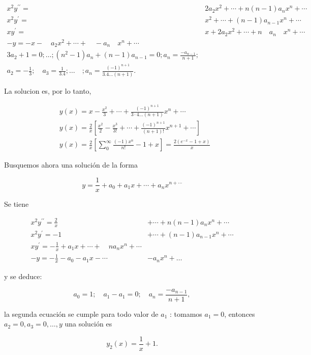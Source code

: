 \documentclass[10pt]{article}
\theoremstyle{plain}
\theoremstyle{definition}
\theoremstyle{remark}
\begin{document}
$$
\begin{array}{cc}
x^{2} y^{\prime \prime}= & 2 a_{2} x^{2}+\cdots+n(n-1) a_{n} x^{n}+\cdots \\
x^{2} y^{\prime}= & x^{2}+\cdots+(n-1) a_{n-1} x^{n}+\cdots \\
x y^{\prime}= & x+2 a_{2} x^{2}+\cdots+n \quad a_{n} \quad x^{n}+\cdots \\
-y=-x-\quad a_{2} x^{2}+\cdots+\quad-a_{n} \quad x^{n}+\cdots \\
3 a_{2}+1=0 ; \ldots ;\left(n^{2}-1\right) a_{n}+(n-1) a_{n-1}=0 ; a_{n}=\frac{-a_{n-1}}{n+1} ; \\
a_{2}=-\frac{1}{3} ; \quad a_{3}=\frac{1}{3.4} ; \ldots \quad ; a_{n}=\frac{(-1)^{n+1}}{3.4 \ldots(n+1)} .
\end{array}
$$

La solucion es, por lo tanto,

$$
\begin{aligned}
& y(x)=x-\frac{x^{2}}{3}+\cdots+\frac{(-1)^{n+1}}{3 \cdot 4 \ldots(n+1)} x^{n}+\cdots \\
& y(x)=\frac{2}{x}\left[\frac{x^{2}}{2}-\frac{x^{3}}{3!}+\cdots+\frac{(-1)^{n+1}}{(n+1)!} x^{n+1}+\cdots\right] \\
& y(x)=\frac{2}{x}\left[\sum_{0}^{\infty} \frac{(-1) x^{n}}{n!}-1+x\right]=\frac{2\left(e^{-x}-1+x\right)}{x}
\end{aligned}
$$

Busquemos ahora una solución de la forma

$$
y=\frac{1}{x}+a_{0}+a_{1} x+\cdots+a_{n} x^{n+\cdots}
$$

Se tiene


$$
\begin{array}{ll}
x^{2} y^{\prime \prime}=\frac{2}{x} & +\cdots+n(n-1) a_{n} x^{n}+\cdots \\
x^{2} y^{\prime}=-1 & +\cdots+(n-1) a_{n-1} x^{n}+\cdots \\
x y^{\prime}=-\frac{1}{x}+a_{1} x+\cdots+\quad n a_{n} x^{n}+\cdots \\
-y=-\frac{1}{x}-a_{0}-a_{1} x-\cdots & -a_{n} x^{n}+\ldots
\end{array}
$$

y se deduce:

$$
a_{0}=1 ; \quad a_{1}-a_{1}=0 ; \quad a_{n}=\frac{-a_{n-1}}{n+1},
$$

la segunda ecuación se cumple para todo valor de $a_{1}$ : tomamos $a_{1}=0$, entonces $a_{2}=0, a_{3}=0, \ldots, y$ una solución es

$$
y_{2}(x)=\frac{1}{x}+1 .
$$
\end{document}
